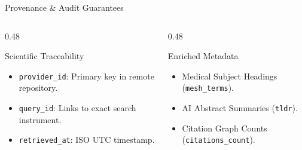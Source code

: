\documentclass[aspectratio=169]{beamer}
\begin{document}
\begin{frame}{Provenance \& Audit Guarantees}
  \begin{columns}[T]
    \begin{column}{0.48\textwidth}
      \begin{block}{Scientific Traceability}
        \begin{itemize}
          \item \texttt{provider\_id}: Primary key in remote repository.
          \item \texttt{query\_id}: Links to exact search instrument.
          \item \texttt{retrieved\_at}: ISO UTC timestamp.
        \end{itemize}
      \end{block}
    \end{column}
    \begin{column}{0.48\textwidth}
      \begin{block}{Enriched Metadata}
        \begin{itemize}
          \item Medical Subject Headings (\texttt{mesh\_terms}).
          \item AI Abstract Summaries (\texttt{tldr}).
          \item Citation Graph Counts (\texttt{citations\_count}).
        \end{itemize}
      \end{block}
    \end{column}
  \end{columns}
\end{frame}
\end{document}

